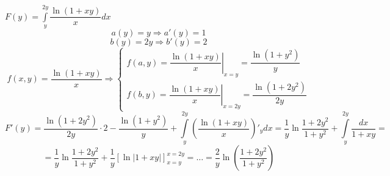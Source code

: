 \documentclass[../../main.tex]{subfiles}
\begin{document}
\begin{example}
    $F(y) = \int\limits_y^{2y} \dfrac{\ln (1 + xy)}{x} dx$
    \[ a(y) = y \Longrightarrow a'(y) = 1 \]
    \[ b(y) = 2y \Longrightarrow b'(y) = 2 \]
    \[ f(x, y) = \dfrac{\ln (1 + xy)}{x} \Longrightarrow
    \begin{cases}
        f(a, y) = \left. \dfrac{\ln (1 + xy)}{x} \right\vert_{x = y}
        = \dfrac{\ln (1 + y^2)}{y} \\
        f(b, y) = \left. \dfrac{\ln (1 + xy)}{x} \right\vert_{x = 2y}
        = \dfrac{\ln (1 + 2y^2)}{2y}
    \end{cases}
    \]
    \[F'(y) = \dfrac{\ln (1 + 2y^2)}{2y} \cdot 2 -\dfrac{\ln (1 + y^2)}{y}
    + \int\limits_y^{2y} \left( \dfrac{\ln (1 + xy)}{x} \right)'_y dx =
    \dfrac{1}{y} \ln \dfrac{1 + 2y^2}{1 + y^2} +
    \int\limits_y^{2y} \dfrac{dx}{1 + xy} = \]
    \[ = \dfrac{1}{y} \ln \dfrac{1 + 2y^2}{1 + y^2}
    +  \dfrac{1}{y} \left[ \ln \left|1 + xy \right| \right]_{x = y}^{x = 2y}
    = \ldots =  \dfrac{2}{y} \ln \left( \dfrac{1 + 2y^2}{1 + y^2} \right) \]
\end{example}
\end{document}
